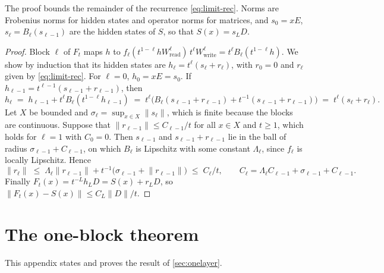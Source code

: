\documentclass[10pt]{article}
\theoremstyle{definition}
\theoremstyle{remark}
\newcommand{\Wread}{W_{\mathrm{read}}}
\newcommand{\Wwrite}{W_{\mathrm{write}}}
\newcommand{\norm}[1]{\lVert #1\rVert}
\begin{document}
\propLimits*

The proof bounds the remainder of the recurrence \cref{eq:limit-rec}. Norms are Frobenius norms for hidden states and operator norms for matrices, and $s_0 = xE$, $s_\ell = B_\ell(s_{\ell-1})$ are the hidden states of $S$, so that $S(x) = s_LD$.

\begin{proof}
Block $\ell$ of $F_t$ maps $h$ to $f_\ell(t^{1-\ell}h\Wread^{\ell})\,t^\ell\Wwrite^{\ell} = t^\ell B_\ell(t^{1-\ell}h)$. We show by induction that its hidden states are $h_\ell = t^\ell(s_\ell + r_\ell)$, with $r_0 = 0$ and $r_\ell$ given by \cref{eq:limit-rec}. For $\ell = 0$, $h_0 = xE = s_0$. If $h_{\ell-1} = t^{\ell-1}(s_{\ell-1} + r_{\ell-1})$, then
\[
h_\ell \;=\; h_{\ell-1} + t^\ell B_\ell(t^{1-\ell}h_{\ell-1}) \;=\; t^\ell\big(B_\ell(s_{\ell-1} + r_{\ell-1}) + t^{-1}(s_{\ell-1} + r_{\ell-1})\big) \;=\; t^\ell(s_\ell + r_\ell).
\]
Let $X$ be bounded and $\sigma_\ell = \sup_{x \in X}\norm{s_\ell}$, which is finite because the blocks are continuous. Suppose that $\norm{r_{\ell-1}} \le C_{\ell-1}/t$ for all $x \in X$ and $t \ge 1$, which holds for $\ell = 1$ with $C_0 = 0$. Then $s_{\ell-1}$ and $s_{\ell-1} + r_{\ell-1}$ lie in the ball of radius $\sigma_{\ell-1} + C_{\ell-1}$, on which $B_\ell$ is Lipschitz with some constant $\Lambda_\ell$, since $f_\ell$ is locally Lipschitz. Hence
\[
\norm{r_\ell} \;\le\; \Lambda_\ell\norm{r_{\ell-1}} + t^{-1}\big(\sigma_{\ell-1} + \norm{r_{\ell-1}}\big) \;\le\; C_\ell/t, \qquad C_\ell = \Lambda_\ell C_{\ell-1} + \sigma_{\ell-1} + C_{\ell-1}.
\]
Finally $F_t(x) = t^{-L}h_LD = S(x) + r_LD$, so $\norm{F_t(x) - S(x)} \le C_L\norm{D}/t$.
\end{proof}

\section{The one-block theorem}\label{app:onelayer}

This appendix states and proves the result of \cref{sec:onelayer}.
\end{document}
